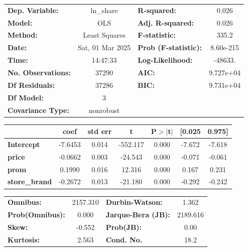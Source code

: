 \documentclass[11pt]{article}
\begin{document}
    \begin{center}
\begin{tabular}{lclc}
\toprule
\textbf{Dep. Variable:}    &    ln\_share     & \textbf{  R-squared:         } &     0.026   \\
\textbf{Model:}            &       OLS        & \textbf{  Adj. R-squared:    } &     0.026   \\
\textbf{Method:}           &  Least Squares   & \textbf{  F-statistic:       } &     335.2   \\
\textbf{Date:}             & Sat, 01 Mar 2025 & \textbf{  Prob (F-statistic):} & 8.60e-215   \\
\textbf{Time:}             &     14:47:33     & \textbf{  Log-Likelihood:    } &   -48633.   \\
\textbf{No. Observations:} &       37290      & \textbf{  AIC:               } & 9.727e+04   \\
\textbf{Df Residuals:}     &       37286      & \textbf{  BIC:               } & 9.731e+04   \\
\textbf{Df Model:}         &           3      & \textbf{                     } &             \\
\textbf{Covariance Type:}  &    nonrobust     & \textbf{                     } &             \\
\bottomrule
\end{tabular}
\begin{tabular}{lcccccc}
                      & \textbf{coef} & \textbf{std err} & \textbf{t} & \textbf{P$> |$t$|$} & \textbf{[0.025} & \textbf{0.975]}  \\
\midrule
\textbf{Intercept}    &      -7.6453  &        0.014     &  -552.117  &         0.000        &       -7.672    &       -7.618     \\
\textbf{price}        &      -0.0662  &        0.003     &   -24.543  &         0.000        &       -0.071    &       -0.061     \\
\textbf{prom}         &       0.1990  &        0.016     &    12.316  &         0.000        &        0.167    &        0.231     \\
\textbf{store\_brand} &      -0.2672  &        0.013     &   -21.180  &         0.000        &       -0.292    &       -0.242     \\
\bottomrule
\end{tabular}
\begin{tabular}{lclc}
\textbf{Omnibus:}       & 2157.310 & \textbf{  Durbin-Watson:     } &    1.362  \\
\textbf{Prob(Omnibus):} &   0.000  & \textbf{  Jarque-Bera (JB):  } & 2189.616  \\
\textbf{Skew:}          &  -0.552  & \textbf{  Prob(JB):          } &     0.00  \\
\textbf{Kurtosis:}      &   2.563  & \textbf{  Cond. No.          } &     18.2  \\
\bottomrule
\end{tabular}
\end{center}
\end{document}
